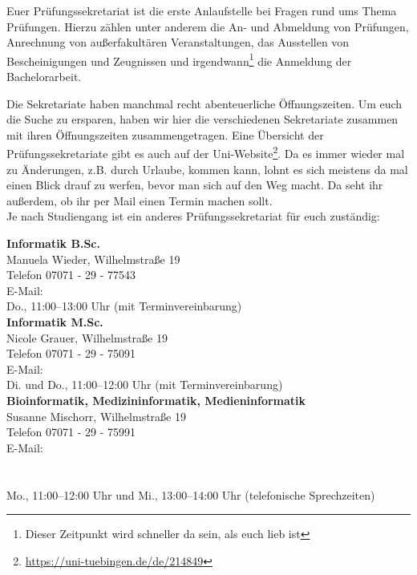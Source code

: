 Euer Prüfungssekretariat ist die erste Anlaufstelle bei Fragen rund ums Thema
Prüfungen. Hierzu zählen unter anderem die An- und Abmeldung von Prüfungen,
Anrechnung von außerfakultären Veranstaltungen, das Ausstellen von
Bescheinigungen und Zeugnissen und irgendwann\footnote{Dieser Zeitpunkt wird
schneller da sein, als euch lieb ist} die Anmeldung der Bachelorarbeit.


Die Sekretariate haben manchmal recht abenteuerliche Öffnungszeiten. Um euch
die Suche zu ersparen, haben wir hier die verschiedenen Sekretariate zusammen
mit ihren Öffnungszeiten zusammengetragen. Eine Übersicht der
Prüfungssekretariate gibt es auch auf der
Uni-Website\footnote{\url{https://uni-tuebingen.de/de/214849}}.
Da es immer wieder mal zu Änderungen, z.B. durch Urlaube, kommen kann,
lohnt es sich meistens da mal einen Blick drauf zu werfen, bevor man sich auf
den Weg macht. Da seht ihr außerdem, ob ihr per Mail einen Termin machen sollt.
\\ %
Je nach Studiengang ist ein anderes Prüfungssekretariat für euch zuständig:


\textbf{Informatik B.Sc.}\\
Manuela Wieder, Wilhelmstraße 19\\
Telefon 07071 - 29 - 77543\\
E-Mail: \\
Do., 11:00--13:00 Uhr (mit Terminvereinbarung)\\

\textbf{Informatik M.Sc.}\\
Nicole Grauer, Wilhelmstraße 19\\
Telefon 07071 - 29 - 75091\\
E-Mail: \\
Di. und Do., 11:00--12:00 Uhr (mit Terminvereinbarung)\\

\textbf{Bioinformatik, Medizininformatik, Medieninformatik}\\
Susanne Mischorr, Wilhelmstraße 19\\
Telefon 07071 - 29 - 75991\\
E-Mail: \\
\hphantom{E-Mail: }\\
\hphantom{E-Mail: } \\
Mo., 11:00--12:00 Uhr und Mi., 13:00--14:00 Uhr (telefonische Sprechzeiten)\\

